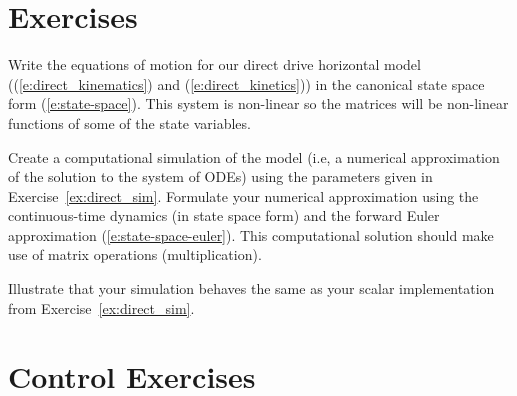 \section{Exercises}
\begin{ex}
Write the equations of motion for our direct drive horizontal model ((\ref{e:direct_kinematics}) and (\ref{e:direct_kinetics})) in the canonical state space form (\ref{e:state-space}).  This system is non-linear so the matrices will be non-linear functions of some of the state variables.
\end{ex}

\begin{ex}
Create a computational simulation of the model (i.e, a numerical approximation of the solution to the system of ODEs) using the parameters given in Exercise~\ref{ex:direct_sim}.  Formulate your numerical approximation using the continuous-time dynamics (in state space form) and the forward Euler approximation (\ref{e:state-space-euler}).  This computational solution should make use of matrix operations (multiplication). 

Illustrate that your simulation behaves the same as your scalar implementation from Exercise~\ref{ex:direct_sim}.
\end{ex}

\section{Control Exercises}

